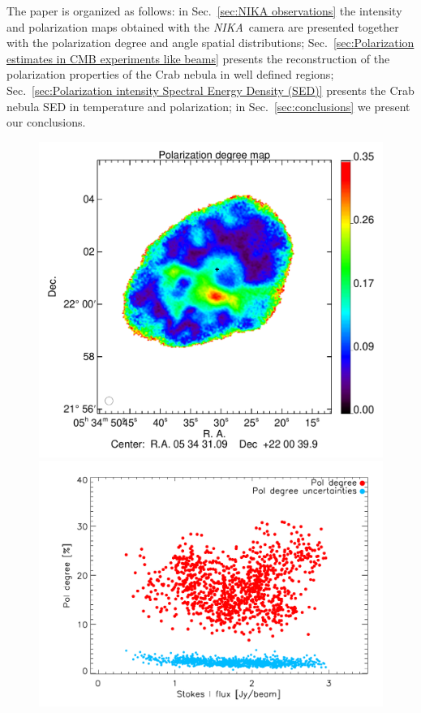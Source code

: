 \documentclass[twocolumn,traditabstract]{aa}
\def\NIKA{\textit{NIKA}}
\begin{document}
The paper is organized as follows: in Sec.~\ref{sec:NIKA observations} the
intensity and polarization maps obtained with the \NIKA\ camera are presented
together with the polarization degree and angle spatial distributions;
Sec.~\ref{sec:Polarization estimates in CMB experiments like beams} presents the
reconstruction of the polarization properties of the Crab nebula in well defined
regions; Sec.~\ref{sec:Polarization intensity Spectral Energy Density (SED)}
presents the Crab nebula SED in temperature and polarization; in
Sec.~\ref{sec:conclusions} we present our conclusions.
 \begin{figure}
\centering
\includegraphics[clip, angle=0, scale = 0.35]{figures/Crab_pol_deg2_2mm.pdf}
\includegraphics[clip, angle=0, scale = 0.5]{figures/pol_deg_vs_I_2mm.pdf}

\end{figure}
\end{document}

